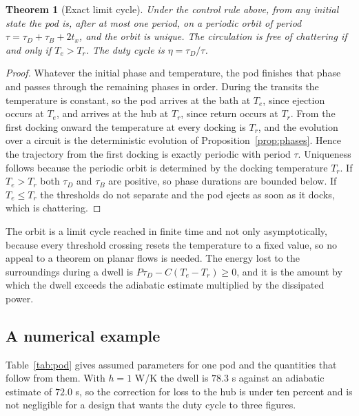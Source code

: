 \documentclass[11pt,openany]{book}
\theoremstyle{plain}
\newtheorem{theorem}{Theorem}[chapter]
\theoremstyle{definition}
\theoremstyle{remark}
\begin{document}
\begin{theorem}[Exact limit cycle]
\label{thm:cycle}
Under the control rule above, from any initial state the pod is, after at most one period, on a periodic orbit of period $\tau=\tau_D+\tau_B+2t_x$, and the orbit is unique. The circulation is free of chattering if and only if $T_e>T_r$. The duty cycle is $\eta=\tau_D/\tau$.
\end{theorem}
\begin{proof}
Whatever the initial phase and temperature, the pod finishes that phase and passes through the remaining phases in order. During the transits the temperature is constant, so the pod arrives at the bath at $T_e$, since ejection occurs at $T_e$, and arrives at the hub at $T_r$, since return occurs at $T_r$. From the first docking onward the temperature at every docking is $T_r$, and the evolution over a circuit is the deterministic evolution of Proposition~\ref{prop:phases}. Hence the trajectory from the first docking is exactly periodic with period $\tau$. Uniqueness follows because the periodic orbit is determined by the docking temperature $T_r$. If $T_e>T_r$ both $\tau_D$ and $\tau_B$ are positive, so phase durations are bounded below. If $T_e\le T_r$ the thresholds do not separate and the pod ejects as soon as it docks, which is chattering.
\end{proof}

The orbit is a limit cycle reached in finite time and not only asymptotically, because every threshold crossing resets the temperature to a fixed value, so no appeal to a theorem on planar flows is needed. The energy lost to the surroundings during a dwell is $P\tau_D-C(T_e-T_r)\ge0$, and it is the amount by which the dwell exceeds the adiabatic estimate multiplied by the dissipated power.

\subsection*{A numerical example}

Table~\ref{tab:pod} gives assumed parameters for one pod and the quantities that follow from them. With $h=1$ W/K the dwell is $78.3$ s against an adiabatic estimate of $72.0$ s, so the correction for loss to the hub is under ten percent and is not negligible for a design that wants the duty cycle to three figures.
\end{document}

